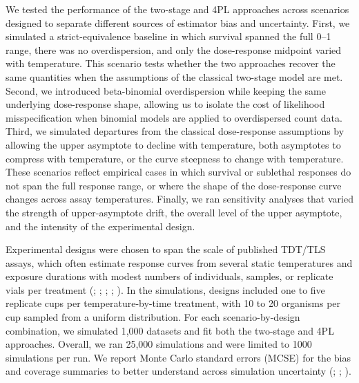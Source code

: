 \documentclass[
  11pt,
]{article}
\begin{document}
We tested the performance of the two-stage and 4PL approaches across
scenarios designed to separate different sources of estimator bias and
uncertainty. First, we simulated a strict-equivalence baseline in which
survival spanned the full 0--1 range, there was no overdispersion, and
only the dose-response midpoint varied with temperature. This scenario
tests whether the two approaches recover the same quantities when the
assumptions of the classical two-stage model are met. Second, we
introduced beta-binomial overdispersion while keeping the same
underlying dose-response shape, allowing us to isolate the cost of
likelihood misspecification when binomial models are applied to
overdispersed count data. Third, we simulated departures from the
classical dose-response assumptions by allowing the upper asymptote to
decline with temperature, both asymptotes to compress with temperature,
or the curve steepness to change with temperature. These scenarios
reflect empirical cases in which survival or sublethal responses do not
span the full response range, or where the shape of the dose-response
curve changes across assay temperatures. Finally, we ran sensitivity
analyses that varied the strength of upper-asymptote drift, the overall
level of the upper asymptote, and the intensity of the experimental
design.

Experimental designs were chosen to span the scale of published TDT/TLS
assays, which often estimate response curves from several static
temperatures and exposure durations with modest numbers of individuals,
samples, or replicate vials per treatment
(;
;
;
;
). In the
simulations, designs included one to five replicate cups per
temperature-by-time treatment, with 10 to 20 organisms per cup sampled
from a uniform distribution. For each scenario-by-design combination, we
simulated 1,000 datasets and fit both the two-stage and 4PL approaches.
Overall, we ran 25,000 simulations and were limited to 1000 simulations
per run. We report Monte Carlo standard errors (MCSE) for the bias and
coverage summaries to better understand across simulation uncertainty
(;
;
).
\end{document}
